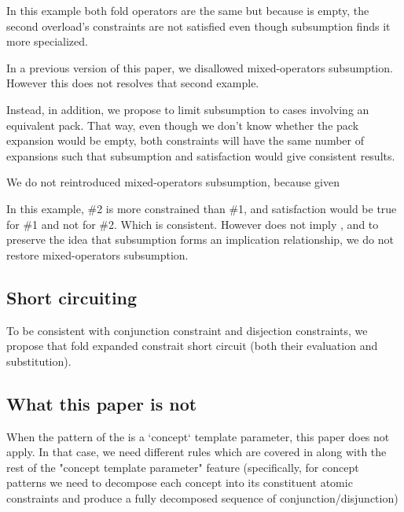 \documentclass{wg21}
\begin{document}
In this example both fold operators are the same but because  is empty,
the second overload's constraints are not satisfied even though subsumption finds it
more specialized.

In a previous version of this paper, we disallowed mixed-operators subsumption.
However this does not resolves that second example.

Instead, in addition, we propose to limit subsumption to cases involving an equivalent pack.
That way, even though we don't know whether the pack expansion would be empty,
both constraints will have the same number of expansions such that
subsumption and satisfaction would give consistent results.

We do not reintroduced mixed-operators subsumption, because given

In this example, \#2 is more constrained than \#1, and satisfaction would be true for \#1 and not for \#2.
Which is consistent. However  does not imply , and to preserve the idea that
subsumption forms an implication relationship, we do not restore mixed-operators subsumption.


\subsection{Short circuiting}

To be consistent with conjunction constraint and disjection constraints, we propose that fold expanded constrait short circuit (both their evaluation and substitution).



\subsection{What this paper is not}

When the pattern of the  is a `concept` template parameter, this paper does not apply. In that case, we need different rules which are covered in  along with the rest of the "concept template parameter" feature (specifically, for concept patterns we need to decompose each concept into its constituent atomic constraints and produce a fully decomposed sequence of conjunction/disjunction)
\end{document}
